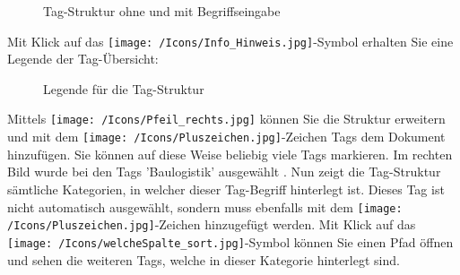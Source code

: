 \begin{figure}[H]
\caption{Tag-Struktur ohne und mit Begriffseingabe}
\end{figure}

Mit Klick auf das \texttt{[image: /Icons/Info\_Hinweis.jpg]}-Symbol  erhalten Sie eine Legende der Tag-Übersicht:

\begin{figure}[H]
\caption{Legende für die Tag-Struktur}
\end{figure}

Mittels \texttt{[image: /Icons/Pfeil\_rechts.jpg]} können Sie die Struktur erweitern und mit dem \texttt{[image: /Icons/Pluszeichen.jpg]}-Zeichen Tags dem Dokument hinzufügen. Sie können auf diese Weise beliebig viele Tags markieren. Im rechten Bild wurde bei den Tags 'Baulogistik' ausgewählt . Nun zeigt die Tag-Struktur sämtliche Kategorien, in welcher dieser Tag-Begriff hinterlegt ist. Dieses Tag ist nicht automatisch ausgewählt, sondern muss ebenfalls mit dem \texttt{[image: /Icons/Pluszeichen.jpg]}-Zeichen hinzugefügt werden. Mit Klick auf das \texttt{[image: /Icons/welcheSpalte\_sort.jpg]}-Symbol können Sie einen Pfad öffnen und sehen die weiteren Tags, welche in dieser Kategorie hinterlegt sind.  \newline

